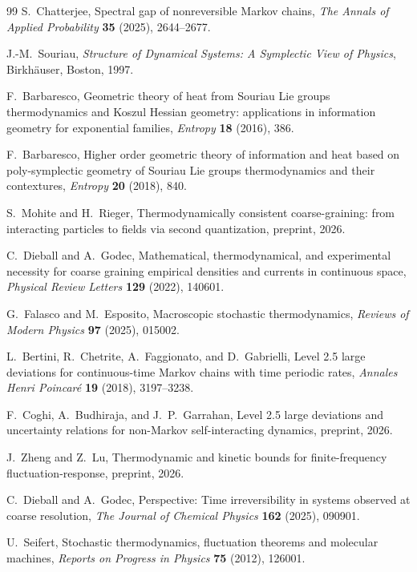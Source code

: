 \documentclass[11pt,a4paper]{article}
\numberwithin{equation}{section}
\theoremstyle{thmcompact}
\theoremstyle{remark}
\begin{document}
\begin{thebibliography}{99}
S.~Chatterjee,
\newblock Spectral gap of nonreversible Markov chains,
\newblock \emph{The Annals of Applied Probability} \textbf{35} (2025), 2644--2677.

J.-M.~Souriau,
\newblock \emph{Structure of Dynamical Systems: A Symplectic View of Physics},
\newblock Birkh\"auser, Boston, 1997.

F.~Barbaresco,
\newblock Geometric theory of heat from Souriau Lie groups thermodynamics and Koszul Hessian geometry: applications in information geometry for exponential families,
\newblock \emph{Entropy} \textbf{18} (2016), 386.

F.~Barbaresco,
\newblock Higher order geometric theory of information and heat based on poly-symplectic geometry of Souriau Lie groups thermodynamics and their contextures,
\newblock \emph{Entropy} \textbf{20} (2018), 840.

S.~Mohite and H.~Rieger,
\newblock Thermodynamically consistent coarse-graining: from interacting particles to fields via second quantization,
\newblock preprint, 2026.

C.~Dieball and A.~Godec,
\newblock Mathematical, thermodynamical, and experimental necessity for coarse graining empirical densities and currents in continuous space,
\newblock \emph{Physical Review Letters} \textbf{129} (2022), 140601.

G.~Falasco and M.~Esposito,
\newblock Macroscopic stochastic thermodynamics,
\newblock \emph{Reviews of Modern Physics} \textbf{97} (2025), 015002.

L.~Bertini, R.~Chetrite, A.~Faggionato, and D.~Gabrielli,
\newblock Level 2.5 large deviations for continuous-time Markov chains with time periodic rates,
\newblock \emph{Annales Henri Poincar\'e} \textbf{19} (2018), 3197--3238.

F.~Coghi, A.~Budhiraja, and J.~P.~Garrahan,
\newblock Level 2.5 large deviations and uncertainty relations for non-Markov self-interacting dynamics,
\newblock preprint, 2026.

J.~Zheng and Z.~Lu,
\newblock Thermodynamic and kinetic bounds for finite-frequency fluctuation-response,
\newblock preprint, 2026.

C.~Dieball and A.~Godec,
\newblock Perspective: Time irreversibility in systems observed at coarse resolution,
\newblock \emph{The Journal of Chemical Physics} \textbf{162} (2025), 090901.

U.~Seifert,
\newblock Stochastic thermodynamics, fluctuation theorems and molecular machines,
\newblock \emph{Reports on Progress in Physics} \textbf{75} (2012), 126001.
\end{thebibliography}
\end{document}
